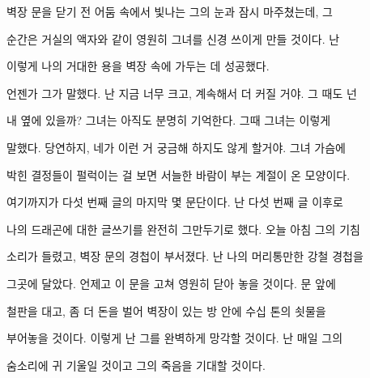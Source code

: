 벽장 문을 닫기 전 어둠 속에서 빛나는 그의 눈과 잠시 마주쳤는데, 그

순간은 거실의 액자와 같이 영원히 그녀를 신경 쓰이게 만들 것이다. 난

이렇게 나의 거대한 용을 벽장 속에 가두는 데 성공했다.



언젠가 그가 말했다. 난 지금 너무 크고, 계속해서 더 커질 거야. 그 때도 넌

내 옆에 있을까? 그녀는 아직도 분명히 기억한다. 그때 그녀는 이렇게

말했다. 당연하지, 네가 이런 거 궁금해 하지도 않게 할거야. 그녀 가슴에

박힌 결정들이 펄럭이는 걸 보면 서늘한 바람이 부는 계절이 온 모양이다.



여기까지가 다섯 번째 글의 마지막 몇 문단이다. 난 다섯 번째 글 이후로

나의 드래곤에 대한 글쓰기를 완전히 그만두기로 했다. 오늘 아침 그의 기침

소리가 들렸고, 벽장 문의 경첩이 부서졌다. 난 나의 머리통만한 강철 경첩을

그곳에 달았다. 언제고 이 문을 고쳐 영원히 닫아 놓을 것이다. 문 앞에

철판을 대고, 좀 더 돈을 벌어 벽장이 있는 방 안에 수십 톤의 쇳물을

부어놓을 것이다. 이렇게 난 그를 완벽하게 망각할 것이다. 난 매일 그의

숨소리에 귀 기울일 것이고 그의 죽음을 기대할 것이다.

